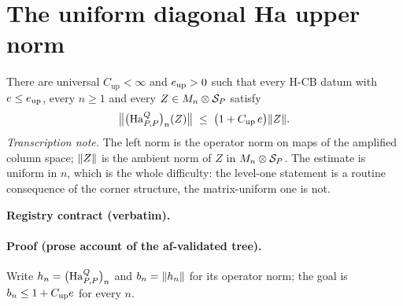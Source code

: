 \section{The uniform diagonal Ha upper norm}\label{sec:hcb3-diagonal-upper-norm}

\begin{lemma}\label{lem:hcb3-diagonal-upper-norm}
There are universal $C_{\mathrm{up}}<\infty$ and $e_{\mathrm{up}}>0$ such that every
H-CB datum with $e\le e_{\mathrm{up}}$, every $n\ge1$ and every
$Z\in M_{n}\otimes \mathcal S_{P}$ satisfy
\begin{equation}\label{eq:un-main}
  \bigl\lVert\bigl(\mathrm{Ha}^{Q}_{P,P}\bigr)_{n}(Z)\bigr\rVert\;\le\;\bigl(1+C_{\mathrm{up}}\,e\bigr)\lVert Z\rVert.
\end{equation}
\emph{Transcription note.} The left norm is the operator norm on maps of the amplified
column space; $\lVert Z\rVert$ is the ambient norm of $Z$ in $M_{n}\otimes \mathcal S_{P}$. The estimate is
uniform in $n$, which is the whole difficulty: the level-one statement is a routine
consequence of the corner structure, the matrix-uniform one is not.
\end{lemma}

\noindent\textbf{Registry contract (verbatim).}

\paragraph{Proof (prose account of the af-validated tree).}
Write $h_n=\bigl(\mathrm{Ha}^{Q}_{P,P}\bigr)_{n}$ and $b_n=\lVert h_n\rVert$ for its operator norm; the goal is
$b_n\le1+C_{\mathrm{up}}e$ for every $n$.

